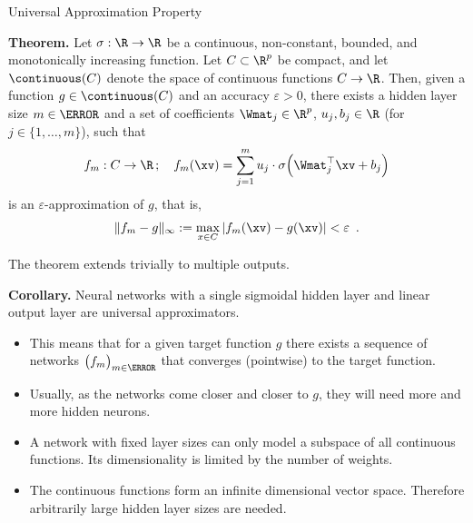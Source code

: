 \begin{vbframe}{Universal Approximation Property}

  \textbf{Theorem.}
  Let $\sigma: \R \to \R$ be a continuous, non-constant, bounded, and
  monotonically increasing function. Let $C \subset \R^p$ be compact,
  and let $\continuous(C)$ denote the space of continuous functions $C \to \R$.
  Then, given a function $g \in \continuous(C)$ and an accuracy $\varepsilon > 0$,
  there exists a hidden layer size $m \in \N$ and a set of coefficients
  $\Wmat_j \in \R^p$, $u_j, b_j \in \R$
  (for $j \in \{1, \dots, m\}$), such that
  $$
    f_m: C \to \R \,;\quad f_m(\xv) = \sum_{j=1}^m u_j \cdot \sigma \Big( \Wmat_j^\top \xv + b_j \Big)
  $$
  is an $\varepsilon$-approximation of $g$, that is,
  $$
    \|f_m - g\|_{\infty}:= \max_{x \in C} |f_m(\xv) - g(\xv)| < \varepsilon
    \enspace.
  $$

  The theorem extends trivially to multiple outputs.

  \framebreak

  \textbf{Corollary.}
  Neural networks with a single sigmoidal hidden layer and linear
  output layer are universal approximators.

  \begin{itemize}
    \item This means that for a given target function $g$ there exists a
    sequence of networks $\big( f_m \big)_{m \in \N}$ that converges
    (pointwise) to the target function.
    \vspace{2mm}
    \item Usually, as the networks come closer and closer to $g$, they
    will need more and more hidden neurons.
    \vspace{2mm}
    \item A network with fixed layer sizes can only model a subspace of all
    continuous functions. Its dimensionality is limited by the number
    of weights.
    \vspace{2mm}
    \item The continuous functions form an infinite dimensional vector space.
    Therefore arbitrarily large hidden layer sizes are needed.
  \end{itemize}

  \framebreak


\end{vbframe}
